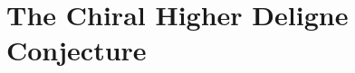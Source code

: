 
\providecommand{\SCchtop}{\mathsf{SC}^{\mathrm{ch},\mathrm{top}}}
\providecommand{\SCchtopKos}{\mathsf{SC}^{\mathrm{ch},\mathrm{top},!}}
\providecommand{\Fact}{\mathrm{Fact}}
\providecommand{\CoFact}{\mathrm{CoFact}}
\providecommand{\FM}{\mathrm{FM}}
\providecommand{\Conf}{\mathrm{Conf}}
\providecommand{\Ran}{\mathrm{Ran}}
\providecommand{\Obs}{\mathsf{Obs}}
\providecommand{\Hoch}{\mathrm{Hoch}}
\providecommand{\ChirHoch}{\mathrm{ChirHoch}}
\providecommand{\Bulk}{\mathrm{Bulk}}
\providecommand{\Bdy}{\mathrm{Bdy}}
\providecommand{\MC}{\mathrm{MC}}
\providecommand{\QME}{\mathrm{QME}}
\providecommand{\End}{\mathrm{End}}
\providecommand{\Mod}{\mathrm{Mod}}
\providecommand{\id}{\mathrm{id}}
\providecommand{\cA}{\mathcal{A}}
\providecommand{\cB}{\mathcal{B}}
\providecommand{\cC}{\mathcal{C}}
\providecommand{\cE}{\mathcal{E}}
\providecommand{\cF}{\mathcal{F}}
\providecommand{\cO}{\mathcal{O}}
\providecommand{\cZ}{\mathcal{Z}}
\providecommand{\cM}{\mathcal{M}}
\providecommand{\fg}{\mathfrak{g}}
\providecommand{\Lie}{\mathsf{Lie}}
\providecommand{\Ass}{\mathsf{Ass}}
\providecommand{\Com}{\mathsf{Com}}
\providecommand{\RHom}{\mathbf{R}\mathrm{Hom}}
\providecommand{\Barch}{\mathrm{B}^{\mathrm{ch}}}
\providecommand{\Cobarch}{\Omega^{\mathrm{ch}}}
\providecommand{\ChirAss}{\mathsf{ChirAss}}

\chapter{The Chiral Higher Deligne Conjecture}
\label{ch:chiral-higher-deligne}


